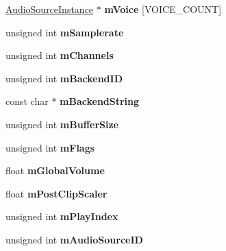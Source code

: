 \begin{DoxyCompactItemize}
\mbox{\hyperlink{class_so_loud_1_1_audio_source_instance}{Audio\+Source\+Instance}} $\ast$ {\bfseries m\+Voice} \mbox{[}V\+O\+I\+C\+E\+\_\+\+C\+O\+U\+NT\mbox{]}
\item 
\mbox{\label{class_so_loud_1_1_soloud_a1811a1e5f7104a1d880099b7e7b70c0a}} 
unsigned int {\bfseries m\+Samplerate}
\item 
\mbox{\label{class_so_loud_1_1_soloud_ac3a7fa610e2ea337ffde5616e19e2037}} 
unsigned int {\bfseries m\+Channels}
\item 
\mbox{\label{class_so_loud_1_1_soloud_ae818b4532985178526e971825e719c00}} 
unsigned int {\bfseries m\+Backend\+ID}
\item 
\mbox{\label{class_so_loud_1_1_soloud_af4a3897977fa03603f5371bc17c31ee6}} 
const char $\ast$ {\bfseries m\+Backend\+String}
\item 
\mbox{\label{class_so_loud_1_1_soloud_a2955ea1257ccbd67c1e89eb9f3ec0a41}} 
unsigned int {\bfseries m\+Buffer\+Size}
\item 
\mbox{\label{class_so_loud_1_1_soloud_a57011ff042e631904b3534686a6a1064}} 
unsigned int {\bfseries m\+Flags}
\item 
\mbox{\label{class_so_loud_1_1_soloud_af1618ff2106c3eac3355651c4d50a050}} 
float {\bfseries m\+Global\+Volume}
\item 
\mbox{\label{class_so_loud_1_1_soloud_afa3d4d921e2c5d6dc858947abf41c6c6}} 
float {\bfseries m\+Post\+Clip\+Scaler}
\item 
\mbox{\label{class_so_loud_1_1_soloud_ae3fab5033ea7bb91c40a81fee2106e17}} 
unsigned int {\bfseries m\+Play\+Index}
\item 
\mbox{\label{class_so_loud_1_1_soloud_a91c8228599cba0c05eb9f609e719022f}} 
unsigned int {\bfseries m\+Audio\+Source\+ID}
\item 
\mbox{\label{class_so_loud_1_1_soloud_abea110ede753f609c45722f626e11429}} 

\end{DoxyCompactItemize}
